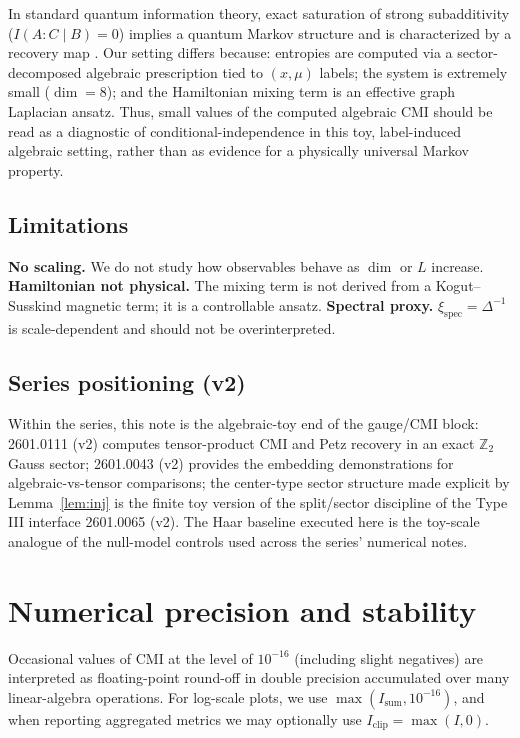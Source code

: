 \documentclass[11pt]{article}
\theoremstyle{remark}
\begin{document}
In standard quantum information theory, exact saturation of strong
subadditivity ($I(A : C \mid B) = 0$) implies a quantum Markov structure
and is characterized by a recovery map \cite{HJPW}. Our setting differs
because: entropies are computed via a sector-decomposed algebraic
prescription tied to $(x, \mu)$ labels; the system is extremely small
($\dim = 8$); and the Hamiltonian mixing term is an effective graph
Laplacian ansatz. Thus, small values of the computed algebraic CMI
should be read as a diagnostic of conditional-independence in this toy,
label-induced algebraic setting, rather than as evidence for a
physically universal Markov property.

\subsection{Limitations}

\textbf{No scaling.} We do not study how observables behave as $\dim$ or
$L$ increase. \textbf{Hamiltonian not physical.} The mixing term is not
derived from a Kogut--Susskind magnetic term; it is a controllable
ansatz. \textbf{Spectral proxy.} $\xi_{\mathrm{spec}} = \Delta^{-1}$ is
scale-dependent and should not be overinterpreted.

\subsection{Series positioning (v2)}

Within the series, this note is the algebraic-toy end of the gauge/CMI
block: 2601.0111 (v2) computes tensor-product CMI and Petz recovery in
an exact $\mathbb{Z}_2$ Gauss sector; 2601.0043 (v2) provides the
embedding demonstrations for algebraic-vs-tensor comparisons; the
center-type sector structure made explicit by Lemma~\ref{lem:inj} is the
finite toy version of the split/sector discipline of the Type III
interface 2601.0065 (v2). The Haar baseline executed here is the
toy-scale analogue of the null-model controls used across the series'
numerical notes.

\section{Numerical precision and stability}

Occasional values of CMI at the level of $10^{-16}$ (including slight
negatives) are interpreted as floating-point round-off in double
precision accumulated over many linear-algebra operations. For log-scale
plots, we use $\max(I_{\mathrm{sum}}, 10^{-16})$, and when reporting
aggregated metrics we may optionally use $I_{\mathrm{clip}} = \max(I,
0)$.
\end{document}
